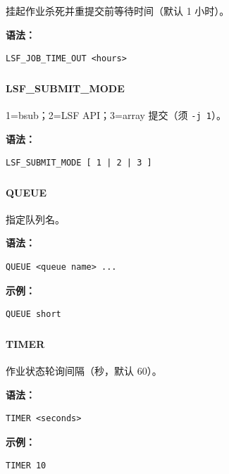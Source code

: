挂起作业杀死并重提交前等待时间（默认 1 小时）。

\textbf{语法：}
\begin{lstlisting}
LSF_JOB_TIME_OUT <hours>
\end{lstlisting}

\subsubsection{}
\paragraph*{LSF_SUBMIT_MODE}

1=bsub；2=LSF API；3=array 提交（须 \texttt{-j 1}）。

\textbf{语法：}
\begin{lstlisting}
LSF_SUBMIT_MODE [ 1 | 2 | 3 ]
\end{lstlisting}

\subsubsection{}
\paragraph*{QUEUE}

指定队列名。

\textbf{语法：}
\begin{lstlisting}
QUEUE <queue name> ...
\end{lstlisting}

\textbf{示例：}
\begin{lstlisting}
QUEUE short
\end{lstlisting}

\subsubsection{}
\paragraph*{TIMER}

作业状态轮询间隔（秒，默认 60）。

\textbf{语法：}
\begin{lstlisting}
TIMER <seconds>
\end{lstlisting}

\textbf{示例：}
\begin{lstlisting}
TIMER 10
\end{lstlisting}

